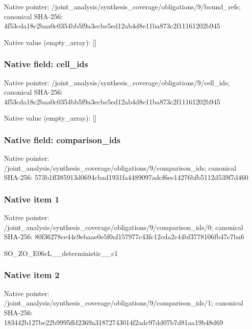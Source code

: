 \documentclass[10pt,a4paper]{article}
\begin{document}
Native pointer: /joint\_analysis/synthesi\allowbreak{}s\_coverage/obligations/9\allowbreak{}/bound\_refs; canonical SHA-256: 4f53cda18c2baa0c0354bb5f\allowbreak{}9a3ecbe5ed12ab4d8e11ba87\allowbreak{}3c2f11161202b945



Native value (empty\_array): []



\subsubsection{Native field: cell\_ids}


Native pointer: /joint\_analysis/synthesi\allowbreak{}s\_coverage/obligations/9\allowbreak{}/cell\_ids; canonical SHA-256: 4f53cda18c2baa0c0354bb5f\allowbreak{}9a3ecbe5ed12ab4d8e11ba87\allowbreak{}3c2f11161202b945



Native value (empty\_array): []



\subsubsection{Native field: comparison\_ids}


Native pointer: /joint\_analysis/synthesi\allowbreak{}s\_coverage/obligations/9\allowbreak{}/comparison\_ids; canonical SHA-256: 573b1ff385913d0694cbad19\allowbreak{}31fa4489097adcf6ee14276b\allowbreak{}fb5112d539f7d460



\subsubsection{Native item 1}


Native pointer: /joint\_analysis/synthesi\allowbreak{}s\_coverage/obligations/9\allowbreak{}/comparison\_ids/0; canonical SHA-256: 80f36278ce44c9ebaae0e5f0\allowbreak{}af157977c43fc12cda2c44bf\allowbreak{}3778106fb47c7ba6


SO\_ZO\_E06cL\_\_deterministic\_\_c1


\subsubsection{Native item 2}


Native pointer: /joint\_analysis/synthesi\allowbreak{}s\_coverage/obligations/9\allowbreak{}/comparison\_ids/1; canonical SHA-256: 183442b127be22b9995ffd23\allowbreak{}69a31872743014f2adc97dd0\allowbreak{}7b7d81aa19b48d69
\end{document}
